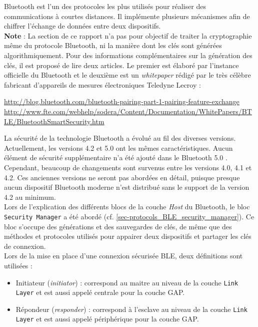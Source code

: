 

Bluetooth est l'un des protocoles les plus utilisés pour réaliser des communications à courtes distances. Il implémente plusieurs mécanismes afin de chiffrer l'échange de données entre deux dispositifs.\\


\textbf{Note} : La section de ce rapport n'a pas pour objectif de traiter la cryptographie même du protocole Bluetooth, ni la manière dont les clés sont générées algorithmiquement. Pour des informations complémentaires sur la génération des clés, il est proposé de lire deux articles. Le premier est élaboré par l'instance officielle du Bluetooth et le deuxième est un \textit{whitepaper} rédigé par le très célèbre fabricant d'appareils de mesures électroniques Teledyne Lecroy : 
\begin{center}
    \footnotesize{\url{http://blog.bluetooth.com/bluetooth-pairing-part-1-pairing-feature-exchange}}
    \footnotesize{\url{http://www.fte.com/webhelp/sodera/Content/Documentation/WhitePapers/BTLE/BluetoothSmartSecurity.htm}}
\end{center}


La sécurité de la technologie Bluetooth a évolué au fil des diverses versions. Actuellement, les versions 4.2 et 5.0 ont les mêmes caractéristiques. Aucun élément de sécurité supplémentaire n'a été ajouté dans le Bluetooth 5.0 \cite{WhatsNe89:online}. Cependant, beaucoup de changements sont survenus entre les versions 4.0, 4.1 et 4.2. Ces anciennes versions ne seront pas abordées en détail, puisque presque aucun dispositif Bluetooth moderne n'est distribué sans le support de la version 4.2 au minimum. \\

Lors de l'explication des différents blocs de la couche \textit{Host} du Bluetooth, le bloc \texttt{Security Manager} a été abordé (cf. \cref{sec-protocols_BLE_security_manager}). Ce bloc s'occupe des générations et des sauvegardes de clés, de même que des méthodes et protocoles utilisés pour appairer deux dispositifs et partager les clés de connexion.\\

Lors de la mise en place d'une connexion sécurisée BLE, deux définitions sont utilisées :
\begin{itemize}
    \item Initiateur (\textit{initiator}) : correspond au maitre au niveau de la couche \texttt{Link Layer} et est aussi appelé centrale pour la couche GAP.
    \item Répondeur (\textit{responder}) : correspond à l'esclave au niveau de la couche \texttt{Link Layer} et est aussi appelé périphérique pour la couche GAP.
\end{itemize}

